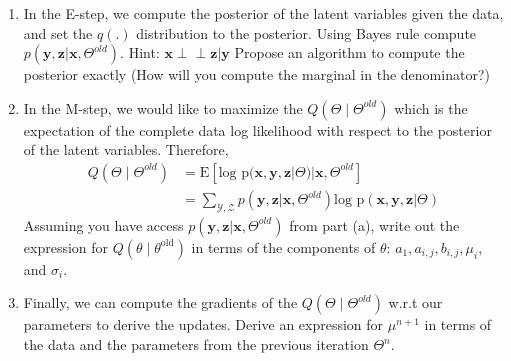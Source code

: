 \documentclass[11pt]{article}
\renewcommand{\vec}[1]{\mathbf{#1}}
\newcommand{\indep}{\perp \!\!\! \perp}
\begin{document}
\begin{enumerate}[{(a)}]
\item In the E-step, we compute the posterior of the latent variables given the data, and set the $q(.)$ distribution to the posterior. Using Bayes rule compute $p(\vec{y}, \vec{z}|\vec{x}, \Theta^{old})$. Hint: $\vec{x} \indep \vec{z} | \vec{y}$ Propose an algorithm to compute the posterior exactly (How will you compute the marginal in the denominator?)
\newline
\begin{answertext}{9cm}{}
    
\end{answertext} 
\item In the M-step, we would like to maximize the $Q(\Theta \mid \Theta^{old})$ which is the expectation of the complete data log likelihood with respect to the posterior of the latent variables. Therefore,
\begin{align}
    Q(\Theta \mid \Theta^{old}) &= \text{E}[\text{log p}(\vec{x}, \vec{y}, \vec{z} | \Theta) | \vec{x}, \Theta^{old}] \\ 
    &= \sum_{\mathcal{Y},\mathcal{Z}} p(\vec{y}, \vec{z}|\vec{x}, \Theta^{old}) \text{log p}(\vec{x}, \vec{y}, \vec{z} | \Theta)
\end{align} Assuming you have access $p(\vec{y}, \vec{z}|\vec{x}, \Theta^{old})$ from part (a), write out the expression for $Q(\theta \mid \theta^\text{old})$ in terms of the components of $\theta$: $a_1, a_{i, j}, b_{i,j}, \mu_i,$ and $\sigma_i$.
\newline
\begin{answertext}{9cm}{}
    
\end{answertext}
\item Finally, we can compute the gradients of the $Q(\Theta \mid \Theta^{old})$ w.r.t our parameters to derive the updates. Derive an expression for $\mu^{n + 1}$ in terms of the data and the parameters from the previous iteration $\Theta^{n}$. 
\newline
\begin{answertext}{9cm}{}
    
\end{answertext}


\end{enumerate}
\end{document}
